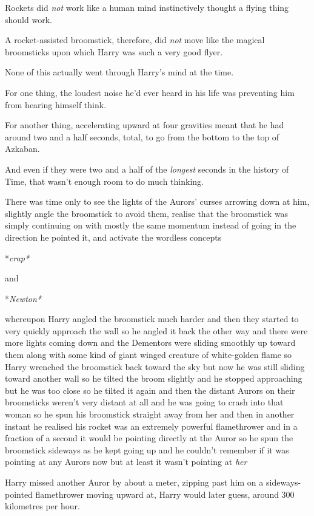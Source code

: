 Rockets did \emph{not} work like a human mind instinctively thought a
flying thing should work.

A rocket-assisted broomstick, therefore, did \emph{not} move like the
magical broomsticks upon which Harry was such a very good flyer.

None of this actually went through Harry's mind at the time.

For one thing, the loudest noise he'd ever heard in his life was
preventing him from hearing himself think.

For another thing, accelerating upward at four gravities meant that he
had around two and a half seconds, total, to go from the bottom to the
top of Azkaban.

And even if they were two and a half of the \emph{longest} seconds in
the history of Time, that wasn't enough room to do much thinking.

There was time only to see the lights of the Aurors' curses arrowing
down at him, slightly angle the broomstick to avoid them, realise that
the broomstick was simply continuing on with mostly the same momentum
instead of going in the direction he pointed it, and activate the
wordless concepts

*\emph{crap*}

and

*\emph{Newton*}

whereupon Harry angled the broomstick much harder and then they started
to very quickly approach the wall so he angled it back the other way and
there were more lights coming down and the Dementors were sliding
smoothly up toward them along with some kind of giant winged creature of
white-golden flame so Harry wrenched the broomstick back toward the sky
but now he was still sliding toward another wall so he tilted the broom
slightly and he stopped approaching but he was too close so he tilted it
again and then the distant Aurors on their broomsticks weren't very
distant at all and he was going to crash into that woman so he spun his
broomstick straight away from her and then in another instant he
realised his rocket was an extremely powerful flamethrower and in a
fraction of a second it would be pointing directly at the Auror so he
spun the broomstick sideways as he kept going up and he couldn't
remember if it was pointing at any Aurors now but at least it wasn't
pointing at \emph{her}

Harry missed another Auror by about a meter, zipping past him on a
sideways-pointed flamethrower moving upward at, Harry would later guess,
around 300 kilometres per hour.

